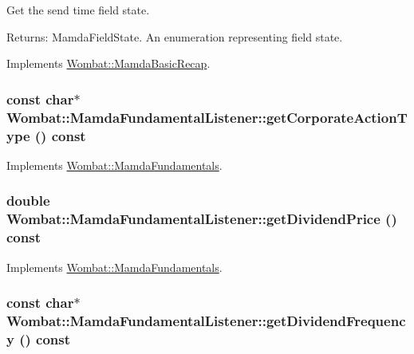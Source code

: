 Get the send time field state. 

\begin{Desc}
\item[Returns:]Mamda\-Field\-State. An enumeration representing field state. \end{Desc}


Implements \hyperlink{classWombat_1_1MamdaBasicRecap_ff1be82223cb7fcfdbc80c4f1e43a849}{Wombat::Mamda\-Basic\-Recap}.\hypertarget{classWombat_1_1MamdaFundamentalListener_5413a673ec90c6b17a47309351d12c5b}{
\subsubsection[getCorporateActionType]{\setlength{\rightskip}{0pt plus 5cm}const char$\ast$ Wombat::Mamda\-Fundamental\-Listener::get\-Corporate\-Action\-Type () const}}
\label{classWombat_1_1MamdaFundamentalListener_5413a673ec90c6b17a47309351d12c5b}




Implements \hyperlink{classWombat_1_1MamdaFundamentals_c7ce1e97b6aa220000ceda1fb346d033}{Wombat::Mamda\-Fundamentals}.\hypertarget{classWombat_1_1MamdaFundamentalListener_b0117a9604ee4b562794e2148c9d514e}{
\subsubsection[getDividendPrice]{\setlength{\rightskip}{0pt plus 5cm}double Wombat::Mamda\-Fundamental\-Listener::get\-Dividend\-Price () const}}
\label{classWombat_1_1MamdaFundamentalListener_b0117a9604ee4b562794e2148c9d514e}




Implements \hyperlink{classWombat_1_1MamdaFundamentals_7f47ca21e75508a2e09d25686dd98b1a}{Wombat::Mamda\-Fundamentals}.\hypertarget{classWombat_1_1MamdaFundamentalListener_233a245991d21d70fb6972091bb56c84}{
\subsubsection[getDividendFrequency]{\setlength{\rightskip}{0pt plus 5cm}const char$\ast$ Wombat::Mamda\-Fundamental\-Listener::get\-Dividend\-Frequency () const}}
\label{classWombat_1_1MamdaFundamentalListener_233a245991d21d70fb6972091bb56c84}




